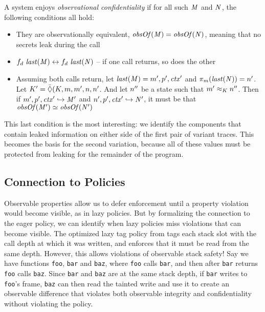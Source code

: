 \documentclass[acmsmall,review,anonymous]{acmart}\settopmatter{printfolios=true,printccs=false,printacmref=false}
\begin{document}
A system enjoys {\em observational confidentiality} if for all such
\(\mathit{M}\) and \(\mathit{N}\), the following conditions all hold:

\begin{itemize}
\item They are observationally equivalent, \(\mathit{obsOf}(\mathit{M}) = \mathit{obsOf}(\mathit{N})\),
  meaning that no secrets leak during the call
\item \(f_d ~ \mathit{last}(\mathit{M}) \leftrightarrow f_d ~ \mathit{last}(\mathit{N})\) --
  if one call returns, so does the other
\item Assuming both calls return, let \(\mathit{last}(\mathit{M}) = m',p',\mathit{ctx}'\)
  and \(\pi_m(\mathit{last}(\mathit{N})) = n'\).
  Let \(K' = \bar{\Diamond}(K,m,m',n,n'\).
  And let \(n''\) be a state such that \(m' \approx_K n''\).
  Then if \(m',p',\mathit{ctx}' \hookrightarrow \mathit{M}'\) and
  \(n',p',\mathit{ctx}' \hookrightarrow \mathit{N}'\), it must be
  that \(\mathit{obsOf}(\mathit{M}') \simeq \mathit{obsOf}(\mathit{N}')\)
\end{itemize}

This last condition is the most interesting: we identify the components that
contain leaked information on either side of the first pair of variant traces.
This becomes the basis for the second variation, because all of these values
must be protected from leaking for the remainder of the program.


\subsection{Connection to Policies}

    Observable properties allow us to defer enforcement until a property
    violation would become visible, as in lazy policies. But by formalizing
    the connection to the eager policy, we can identify when lazy policies
    miss violations that can become visible. The optimized lazy tag policy from
    \citet{DBLP:conf/sp/RoesslerD18} tags each stack slot with the call depth
    at which it was written, and enforces that it must be read from the
    same depth. However, this allows violations of observable stack safety!
    Say we have functions {\tt foo}, {\tt bar} and {\tt baz}, where {\tt foo}
    calls {\tt bar}, and then after {\tt bar} returns {\tt foo} calls
    {\tt baz}. Since {\tt bar} and {\tt baz} are at the same stack depth, if
    {\tt bar} writes to {\tt foo}'s frame, {\tt baz} can then read the tainted
    write and use it to create an observable difference that violates both
    observable integrity and confidentiality without violating the policy.
\end{document}
